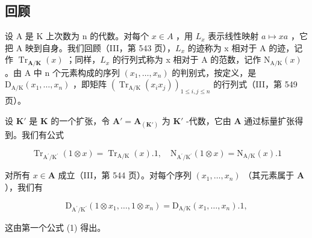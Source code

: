 \subsection{回顾}

设 A 是 K 上次数为 n 的代数。对每个 \(x \in A\) ，用 \(L_{x}\) 表示线性映射 \(a \mapsto xa\) ，它把 A 映到自身。我们回顾（III，第 543 页），\(L_{x}\) 的迹称为 x 相对于 A 的迹，记作 \(\operatorname{Tr}_{\mathbf{A}/\mathbf{K}}(x)\) ；同样，\(L_{x}\) 的行列式称为 x 相对于 A 的范数，记作 \(\mathrm{N}_{\mathrm{A}/\mathrm{K}}(x)\) 。由 A 中 n 个元素构成的序列 \((x_{1}, \ldots, x_{n})\) 的判别式，按定义，是 \(\mathrm{D}_{\mathrm{A}/\mathrm{K}}(x_{1}, \ldots, x_{n})\) ，即矩阵 \((\operatorname{Tr}_{\mathrm{A}/\mathrm{K}}(x_{i}x_{j}))_{1 \leq i,j \leq n}\) 的行列式（III，第 549 页）。

设 \(\mathbf{K}'\) 是 \(\mathbf{K}\) 的一个扩张，令 \(\mathbf{A}' = \mathbf{A}_{(\mathbf{K}')}\) 为 \(\mathbf{K}'\) -代数，它由 \(\mathbf{A}\) 通过标量扩张得到。我们有公式

\[
\operatorname{Tr} _ {\mathrm{A} ^ {\prime} / \mathrm{K} ^ {\prime}} (1 \otimes x) = \operatorname{Tr} _ {\mathrm{A} / \mathrm{K}} (x). 1, \quad \mathrm{N} _ {\mathrm{A} ^ {\prime} / \mathrm{K} ^ {\prime}} (1 \otimes x) = \mathrm{N} _ {\mathrm{A} / \mathrm{K}} (x). 1\tag{1}
\]

对所有 \(x \in \mathbf{A}\) 成立（III，第 544 页）。对每个序列 \((x_1, \ldots, x_n)\) （其元素属于 \(\mathbf{A}\) ），我们有

\[
\mathrm{D} _ {\mathrm{A} ^ {\prime} / \mathrm{K} ^ {\prime}} (1 \otimes x _ {1}, \dots , 1 \otimes x _ {n}) = \mathrm{D} _ {\mathrm{A} / \mathrm{K}} (x _ {1}, \dots , x _ {n}). 1,\tag{2}
\]

这由第一个公式 (1) 得出。

